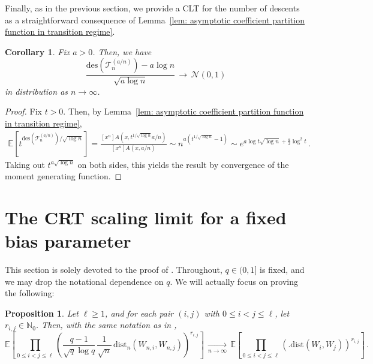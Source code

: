 \documentclass{article}
\newtheorem{proposition}[theorem]{Proposition}
\newtheorem{corollary}[theorem]{Corollary}
\theoremstyle{remark}
\newcommand{\bN}{\mathbb{N}}
\newcommand{\cv}[1]{\,\underset{#1}{\longrightarrow}\,}
\newcommand{\dist}{\mathrm{dist}}
\newcommand{\cT}{\mathcal{T}}
\newcommand{\expec}[1]{\mathbb{E}{\left[#1\right]}}
\newcommand{\Normal}[2]{\mathcal{N}{\left(#1,#2\right)}}
\newcommand{\des}[1]{{\mathrm{des}{\left(#1\right)}}}
\begin{document}
Finally, as in the previous section, we provide a CLT for the number of descents as a straightforward consequence of Lemma~\ref{lem: asymptotic coefficient partition function in transition regime}.

\begin{corollary}\label{cor: CLT descents q=a/n}
    Fix $a>0$.
    Then, we have
    \begin{equation*}
        \frac{\des{\cT_n^{(a/n)}} - a\log n}{\sqrt{a \log n}}
        \cv{} \Normal{0}{1}
    \end{equation*}
    in distribution as $n\to\infty$.
\end{corollary}

\begin{proof}
    Fix $t>0$.
    Then, by Lemma~\ref{lem: asymptotic coefficient partition function in transition regime},
    \begin{align*}
        \expec{ t^{\des{\cT_n^{(a/n)}} / \sqrt{\log n}} }
        = \frac{[x^n] A(x, t^{1/\sqrt{\log n}} a/n)}{[x^n] A(x,a/n)}
        \sim n^{a\left( t^{1/\sqrt{\log n}} - 1 \right)}
        \sim e^{a\log t \sqrt{\log n} + \frac{a}{2}\log^2 t} \,.
    \end{align*}
    Taking out $t^{a\sqrt{\log n}}$ on both sides, this yields the result by convergence of the moment generating function.
\end{proof}


\section{The CRT scaling limit for a fixed bias parameter}
\label{sec:scaling limit supercritical}

This section is solely devoted to the proof of .
Throughout, $q\in(0,1]$ is fixed, and we may drop the notational dependence on $q$.
We will actually focus on proving the following:

\begin{proposition}\label{prop: joint moments cv to CRT}
    Let $\ell\ge1$, and for each pair $(i,j)$ with $0\le i<j\le \ell$, let $r_{i,j} \in \bN_0$.
    Then, with the same notation as in ,
    \begin{equation*}
        \expec{ \prod_{0\le i<j\le \ell}
        \left( \frac{q-1}{\sqrt q \log q} \,\frac{1}{\sqrt n}
        \,\dist_n{\left( W_{n,i} , W_{n,j} \right)} \right)^{r_{i,j}}
        }
        \cv{n\to\infty}
        \expec{ \prod_{0\le i<j\le \ell}
        \left(\big. \dist{\left( W_{i} , W_{j} \right)} \right)^{r_{i,j}}
        } \,.
    \end{equation*}
\end{proposition}
\end{document}
